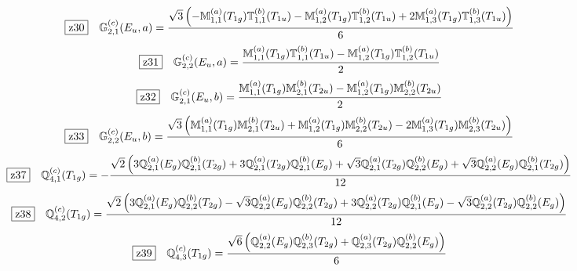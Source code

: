 \documentclass[fleqn,10pt,landscape]{jsarticle}
\begin{document}
\begin{dmath*}
\hspace*{3mm}\fbox{z30}\quad \mathbb{G}_{2,1}^{(c)}(E_{u},a)=\frac{\sqrt{3} \left(- \mathbb{M}_{1,1}^{(a)}(T_{1g}) \mathbb{T}_{1,1}^{(b)}(T_{1u}) - \mathbb{M}_{1,2}^{(a)}(T_{1g}) \mathbb{T}_{1,2}^{(b)}(T_{1u}) + 2 \mathbb{M}_{1,3}^{(a)}(T_{1g}) \mathbb{T}_{1,3}^{(b)}(T_{1u})\right)}{6}
\end{dmath*}
\begin{dmath*}
\hspace*{3mm}\fbox{z31}\quad \mathbb{G}_{2,2}^{(c)}(E_{u},a)=\frac{\mathbb{M}_{1,1}^{(a)}(T_{1g}) \mathbb{T}_{1,1}^{(b)}(T_{1u}) - \mathbb{M}_{1,2}^{(a)}(T_{1g}) \mathbb{T}_{1,2}^{(b)}(T_{1u})}{2}
\end{dmath*}
\begin{dmath*}
\hspace*{3mm}\fbox{z32}\quad \mathbb{G}_{2,1}^{(c)}(E_{u},b)=\frac{\mathbb{M}_{1,1}^{(a)}(T_{1g}) \mathbb{M}_{2,1}^{(b)}(T_{2u}) - \mathbb{M}_{1,2}^{(a)}(T_{1g}) \mathbb{M}_{2,2}^{(b)}(T_{2u})}{2}
\end{dmath*}
\begin{dmath*}
\hspace*{3mm}\fbox{z33}\quad \mathbb{G}_{2,2}^{(c)}(E_{u},b)=\frac{\sqrt{3} \left(\mathbb{M}_{1,1}^{(a)}(T_{1g}) \mathbb{M}_{2,1}^{(b)}(T_{2u}) + \mathbb{M}_{1,2}^{(a)}(T_{1g}) \mathbb{M}_{2,2}^{(b)}(T_{2u}) - 2 \mathbb{M}_{1,3}^{(a)}(T_{1g}) \mathbb{M}_{2,3}^{(b)}(T_{2u})\right)}{6}
\end{dmath*}
\begin{dmath*}
\hspace*{3mm}\fbox{z37}\quad \mathbb{Q}_{4,1}^{(c)}(T_{1g})=- \frac{\sqrt{2} \left(3 \mathbb{Q}_{2,1}^{(a)}(E_{g}) \mathbb{Q}_{2,1}^{(b)}(T_{2g}) + 3 \mathbb{Q}_{2,1}^{(a)}(T_{2g}) \mathbb{Q}_{2,1}^{(b)}(E_{g}) + \sqrt{3} \mathbb{Q}_{2,1}^{(a)}(T_{2g}) \mathbb{Q}_{2,2}^{(b)}(E_{g}) + \sqrt{3} \mathbb{Q}_{2,2}^{(a)}(E_{g}) \mathbb{Q}_{2,1}^{(b)}(T_{2g})\right)}{12}
\end{dmath*}
\begin{dmath*}
\hspace*{3mm}\fbox{z38}\quad \mathbb{Q}_{4,2}^{(c)}(T_{1g})=\frac{\sqrt{2} \left(3 \mathbb{Q}_{2,1}^{(a)}(E_{g}) \mathbb{Q}_{2,2}^{(b)}(T_{2g}) - \sqrt{3} \mathbb{Q}_{2,2}^{(a)}(E_{g}) \mathbb{Q}_{2,2}^{(b)}(T_{2g}) + 3 \mathbb{Q}_{2,2}^{(a)}(T_{2g}) \mathbb{Q}_{2,1}^{(b)}(E_{g}) - \sqrt{3} \mathbb{Q}_{2,2}^{(a)}(T_{2g}) \mathbb{Q}_{2,2}^{(b)}(E_{g})\right)}{12}
\end{dmath*}
\begin{dmath*}
\hspace*{3mm}\fbox{z39}\quad \mathbb{Q}_{4,3}^{(c)}(T_{1g})=\frac{\sqrt{6} \left(\mathbb{Q}_{2,2}^{(a)}(E_{g}) \mathbb{Q}_{2,3}^{(b)}(T_{2g}) + \mathbb{Q}_{2,3}^{(a)}(T_{2g}) \mathbb{Q}_{2,2}^{(b)}(E_{g})\right)}{6}
\end{dmath*}
\end{document}
